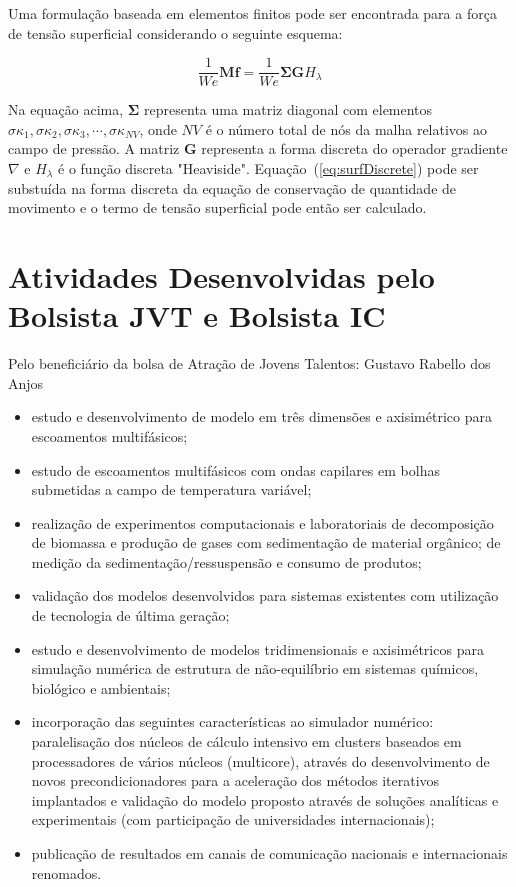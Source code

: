 \documentclass[a4paper,portuges,12pt]{article}
\newcommand{\fvet}{\mathbf{f}}
\begin{document}
Uma formulação baseada em elementos finitos pode ser encontrada para a
força de tensão superficial considerando o seguinte esquema: 

\begin{equation}
	\frac{1}{We}\mathbf{M} \fvet 
	= 
	\frac{1}{We} \mathbf{\Sigma} \mathbf{G} H_{\lambda}
	\label{eq:surfDiscrete}
\end{equation}

Na equação acima, $\mathbf{\Sigma}$ representa uma matriz diagonal com
elementos $\sigma \kappa_1, \sigma \kappa_2, \sigma \kappa_3,\cdots,
\sigma \kappa_{NV}$, onde $NV$ é o número total de nós da malha
relativos ao campo de pressão. A matriz $\mathbf{G}$ representa a forma
discreta do operador gradiente $\nabla$ e $H_{\lambda}$ é o função
discreta "Heaviside". Equação~(\ref{eq:surfDiscrete}) pode ser substuída
na forma discreta da equação de conservação de quantidade de movimento e
o termo de tensão superficial pode então ser calculado. 

\section{Atividades Desenvolvidas pelo Bolsista JVT e Bolsista IC}

Pelo beneficiário da bolsa de Atração de Jovens Talentos: Gustavo Rabello
dos Anjos
\begin{itemize}
\item estudo e desenvolvimento de modelo em três dimensões e axisimétrico
para escoamentos multifásicos;
\item estudo de escoamentos multifásicos com ondas capilares em bolhas
submetidas a campo de temperatura variável;
\item realização de experimentos computacionais e laboratoriais de
decomposição de biomassa e produção de gases com sedimentação de
material orgânico; de medição da sedimentação/ressuspensão e consumo de
produtos;
\item validação dos modelos desenvolvidos para sistemas existentes com
utilização de tecnologia de última geração;
\item estudo e desenvolvimento de modelos tridimensionais e axisimétricos
para simulação numérica de estrutura de não-equilíbrio em sistemas
químicos, biológico e ambientais;
\item incorporação das seguintes características ao simulador numérico:
paralelisação dos núcleos de cálculo intensivo em clusters baseados em
processadores de vários núcleos (multicore), através do desenvolvimento
de novos precondicionadores para a aceleração dos métodos iterativos
implantados e validação do modelo proposto através de soluções
analíticas e experimentais (com participação de universidades
internacionais);
\item publicação de resultados em canais de comunicação nacionais e
internacionais renomados.
\end{itemize}
\end{document}
